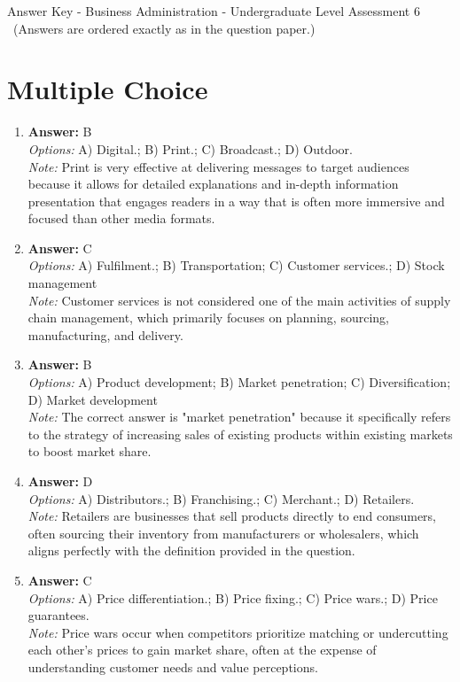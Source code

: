 \documentclass[12pt]{article}
\begin{document}
\begin{center}
Answer Key - Business Administration - Undergraduate Level Assessment 6 \
\small (Answers are ordered exactly as in the question paper.)
\end{center}

\section*{Multiple Choice}
\begin{enumerate}[label=\arabic*.]
\item \textbf{Answer:} B
\\ \textit{Options:} A) Digital.; B) Print.; C) Broadcast.; D) Outdoor.
\\ \textit{Note:} Print is very effective at delivering messages to target audiences because it allows for detailed explanations and in-depth information presentation that engages readers in a way that is often more immersive and focused than other media formats.
\item \textbf{Answer:} C
\\ \textit{Options:} A) Fulfilment.; B) Transportation; C) Customer services.; D) Stock management
\\ \textit{Note:} Customer services is not considered one of the main activities of supply chain management, which primarily focuses on planning, sourcing, manufacturing, and delivery.
\item \textbf{Answer:} B
\\ \textit{Options:} A) Product development; B) Market penetration; C) Diversification; D) Market development
\\ \textit{Note:} The correct answer is "market penetration" because it specifically refers to the strategy of increasing sales of existing products within existing markets to boost market share.
\item \textbf{Answer:} D
\\ \textit{Options:} A) Distributors.; B) Franchising.; C) Merchant.; D) Retailers.
\\ \textit{Note:} Retailers are businesses that sell products directly to end consumers, often sourcing their inventory from manufacturers or wholesalers, which aligns perfectly with the definition provided in the question.
\item \textbf{Answer:} C
\\ \textit{Options:} A) Price differentiation.; B) Price fixing.; C) Price wars.; D) Price guarantees.
\\ \textit{Note:} Price wars occur when competitors prioritize matching or undercutting each other's prices to gain market share, often at the expense of understanding customer needs and value perceptions.
\end{enumerate}
\end{document}
